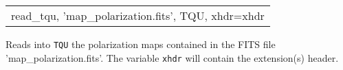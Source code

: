 \begin{example}
{
\begin{tabular}{l} %
read\_tqu, 'map\_polarization.fits', TQU, xhdr=xhdr\\
\end{tabular}
}
{
Reads into {\tt TQU} the polarization maps contained in the FITS file
'map\_polarization.fits'.
The variable {\tt xhdr} will contain the extension(s) header.
}
\end{example}

